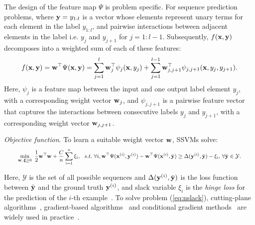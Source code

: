 The design of the feature map $\Psi$ is problem specific.
For sequence prediction problems,
where $\mathbf{y} = y_{1 : l}$
is a vector whose elements represent unary
terms for each element in the label $y_{1:l}$, and pairwise interactions between
adjacent
elements in the label
i.e. $y_j$ and $y_{j+1}$ for $j=1 : l \!-\! 1$.
Subsequently, $f(\mathbf{x},\mathbf{y})$ decomposes into a weighted sum of
each of these features: %
\begin{equation}
\label{eq:jointfeature}
f(\mathbf{x}, \mathbf{y}) = \mathbf{w}^\top \Psi(\mathbf{x}, \mathbf{y}) = 
\sum_{j=1}^l \mathbf{w}_j^\top \psi_j(\mathbf{x}, y_j) + \sum_{j=1}^{l-1} \mathbf{w}_{j,j+1}^\top \psi_{j,j+1}(\mathbf{x}, y_{j}, y_{j+1}).
\end{equation}
Here, $\psi_j$ is a feature map between the input and one output label element $y_j$, with a corresponding weight vector $\mathbf{w}_j$,
and $\psi_{j,j+1}$ is a pairwise feature vector that captures the interactions between consecutive labels $y_j$ and $y_{j+1}$,
with a corresponding weight vector $\mathbf{w}_{j,j+1}$.

\emph{Objective function}.
To learn a suitable weight vector $\mathbf{w}$, SSVMs solve: %
\begin{equation}
\label{eq:nslack}
\resizebox{0.93\linewidth}{!}{$\displaystyle
\begin{aligned}
\min_{\w, \, \bm{\xi} \ge 0} ~\frac{1}{2} \w^\top \w + \frac{C}{n} \sum_{i=1}^n \xi_i,  ~~s.t.~  \forall i, 
  \w^\top \Psi(\x^{(i)}, \y^{(i)}) - \w^\top \Psi(\x^{(i)}, \bar{\y}) \ge
  \Delta(\y^{(i)}, \bar{\y}) - \xi_i, \, \forall \bar\y \in \mathcal{Y}.
\end{aligned}
$}
\end{equation}

Here, 
$\mathcal{Y}$ is the set of all possible sequences
and $\Delta(\mathbf{y}^{({i})}, \bar{\mathbf{y}})$ is the loss function between $\bar{\mathbf{y}}$ and the ground truth $\mathbf{y}^{({i})}$,
and slack variable $\xi_i$ is the \emph{hinge loss} for the prediction of the $i$-th example~\cite{tsochantaridis2005large}.
To solve problem (\ref{eq:nslack}),
cutting-plane algorithms~\cite{joachims2009predicting}, %
gradient-based algorithms~\cite{ratliff2006subgradient} %
and conditional gradient methods~\cite{lacoste2013block} %
are widely used in practice~\cite{muller2014methods}.


